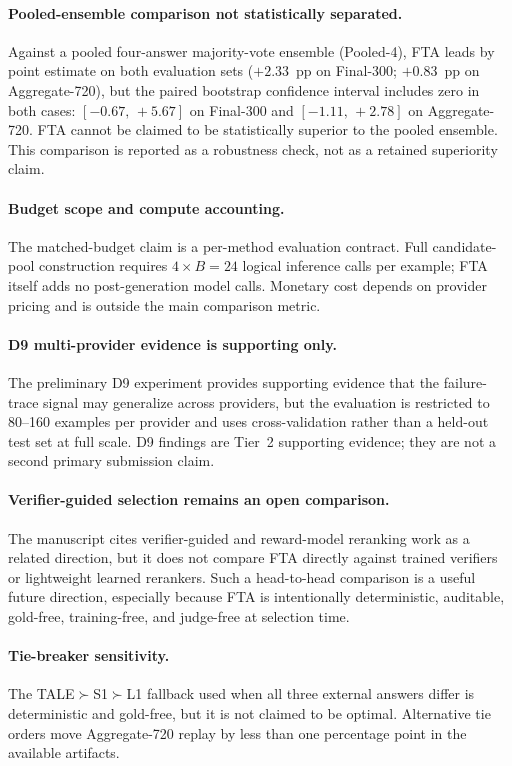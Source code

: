 \paragraph{Pooled-ensemble comparison not statistically separated.}
Against a pooled four-answer majority-vote ensemble (Pooled-4), FTA leads by
point estimate on both evaluation sets ($+2.33$~pp on Final-300;
$+0.83$~pp on Aggregate-720), but the paired bootstrap confidence interval
includes zero in both cases: $[-0.67,\,+5.67]$ on Final-300 and
$[-1.11,\,+2.78]$ on Aggregate-720.
FTA cannot be claimed to be statistically superior to the pooled ensemble.
This comparison is reported as a robustness check, not as a retained
superiority claim.

\paragraph{Budget scope and compute accounting.}
The matched-budget claim is a per-method evaluation contract.
Full candidate-pool construction requires $4 \times B = 24$ logical inference
calls per example; FTA itself adds no post-generation model calls.
Monetary cost depends on provider pricing and is outside the main comparison
metric.

\paragraph{D9 multi-provider evidence is supporting only.}
The preliminary D9 experiment provides supporting evidence that the
failure-trace signal may generalize across providers, but the evaluation is
restricted to 80--160 examples per provider and uses cross-validation rather
than a held-out test set at full scale.
D9 findings are Tier~2 supporting evidence; they are not a second primary
submission claim.

\paragraph{Verifier-guided selection remains an open comparison.}
The manuscript cites verifier-guided and reward-model reranking work as a
related direction, but it does not compare FTA directly against trained
verifiers or lightweight learned rerankers. Such a head-to-head comparison is a
useful future direction, especially because FTA is intentionally deterministic,
auditable, gold-free, training-free, and judge-free at selection time.

\paragraph{Tie-breaker sensitivity.}
The TALE$\succ$S1$\succ$L1 fallback used when all three external answers
differ is deterministic and gold-free, but it is not claimed to be optimal.
Alternative tie orders move Aggregate-720 replay by less than one percentage
point in the available artifacts.

